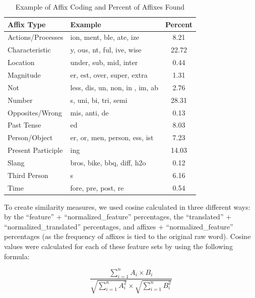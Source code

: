 \documentclass[english,,man]{apa6}
\begin{document}
\begin{table}[tbp]
\begin{center}
\begin{threeparttable}
\caption{\label{tab:affix-table}Example of Affix Coding and Percent of Affixes Found}
\begin{tabular}{llc}
\toprule
Affix Type & Example & Percent\\
\midrule
Actions/Processes & ion, ment, ble, ate, ize & 8.21\\
Characteristic & y, ous, nt, ful, ive, wise & 22.72\\
Location & under, sub, mid, inter & 0.44\\
Magnitude & er, est, over, super, extra & 1.31\\
Not & less, dis, un, non, in , im, ab & 2.76\\
Number & s, uni, bi, tri, semi & 28.31\\
Opposites/Wrong & mis, anti, de & 0.13\\
Past Tense & ed & 8.03\\
Person/Object & er, or, men, person, ess, ist & 7.23\\
Present Participle & ing & 14.03\\
Slang & bros, bike, bbq, diff, h2o & 0.12\\
Third Person & s & 6.16\\
Time & fore, pre, post, re & 0.54\\
\bottomrule
\end{tabular}
\end{threeparttable}
\end{center}
\end{table}

To create similarity measures, we used cosine calculated in three different ways: by the \enquote{feature} + \enquote{normalized\_feature} percentages, the \enquote{translated} + \enquote{normalized\_translated} percentages, and affixes + \enquote{normalized\_feature} percentages (as the frequency of affixes is tied to the original raw word). Cosine values were calculated for each of these feature sets by using the following formula:

\[
\frac{\sum_{i=1}^{n} A_i \times B_i} {\sqrt{\sum_{i=1}^{n} A_i^2} \times \sqrt{\sum_{i=1}^{n} B_i^2}}
\]
\end{document}
